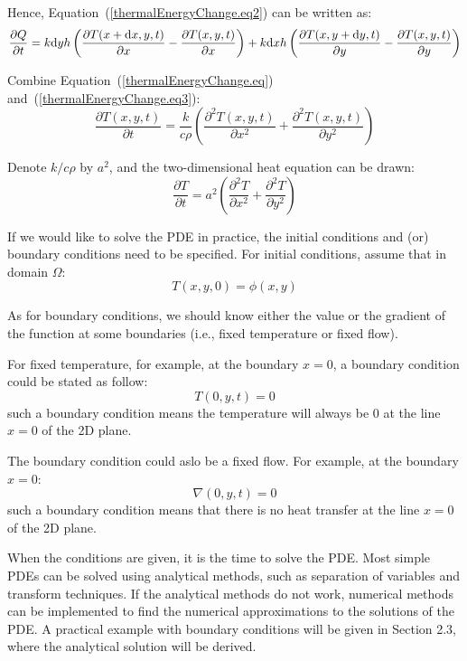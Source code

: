 Hence, Equation~(\ref{thermalEnergyChange.eq2}) can be written as:
\begin{equation}\label{thermalEnergyChange.eq3}
\frac{\partial Q}{\partial t}=k\mathrm d yh\left(\frac{\partial T(x+\mathrm d x,y,t)}{\partial x}-\frac{\partial T(x,y,t)}{\partial x}\right)+k\mathrm d xh\left(\frac{\partial T(x,y+\mathrm d y,t)}{\partial y}-\frac{\partial T(x,y,t)}{\partial y}\right)
\end{equation}

Combine Equation~(\ref{thermalEnergyChange.eq}) and~(\ref{thermalEnergyChange.eq3}):
\begin{equation}
\frac{\partial T(x,y,t)}{\partial t}=\frac{k}{c\rho}\left(\frac{\partial ^2 T(x,y,t)}{\partial x^2}+\frac{\partial ^2 T(x,y,t)}{\partial y^2}\right)
\end{equation}

Denote $k/c\rho$ by $a^2$, and the two-dimensional heat equation can be drawn:
\begin{equation}
\frac{\partial T}{\partial t}=a^2\left(\frac{\partial ^2 T}{\partial x^2}+\frac{\partial ^2 T}{\partial y^2}\right)
\end{equation}

If we would like to solve the PDE in practice, the initial conditions and (or) boundary conditions need to be specified. For initial conditions, assume that in domain $\Omega$:
\begin{equation}
T(x,y,0)=\phi(x,y) 
\end{equation}

As for boundary conditions, we should know either the value or the gradient of the function at some boundaries (i.e., fixed temperature or fixed flow).

For fixed temperature, for example, at the boundary $x=0$, a boundary condition could be stated as follow:
\begin{equation}
T(0, y, t)=0
\end{equation}  
such a boundary condition means the temperature will always be $0$ at the line $x=0$ of the 2D plane.

The boundary condition could aslo be a fixed flow. For example, at the boundary $x=0$:
\begin{equation}
\nabla (0, y, t)=0
\end{equation}
such a boundary condition means that there is no heat transfer at the line $x=0$ of the 2D plane.

When the conditions are given, it is the time to solve the PDE. Most simple PDEs can be solved using analytical methods, such as separation of variables and transform techniques. If the analytical methods do not work, numerical methods can be implemented to find the numerical approximations to the solutions of the PDE. A practical example with boundary conditions will be given in Section 2.3, where the analytical solution will be derived.

